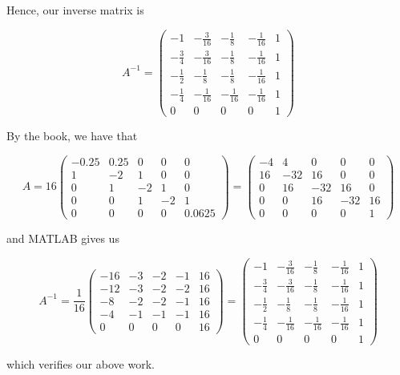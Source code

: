 \begin{solution}
     Hence, our inverse matrix is
     
     $$A^{-1}=\left(\begin{array}{ccccc} -1 & -\frac{3}{16} & -\frac18 & -\frac{1}{16}& 1 
                                      \\ -\frac{3}{4} & -\frac{3}{16} & -\frac18 & -\frac{1}{16} & 1
                                      \\ -\frac12 & -\frac18 & -\frac18 & -\frac{1}{16} & 1
                                      \\ -\frac14 & -\frac{1}{16} & -\frac{1}{16} & -\frac{1}{16} & 1
                                      \\ 0 & 0 & 0 & 0 & 1 \end{array}\right)$$
                                      
    By the book, we have that
    
    $$A=16\left(\begin{array}{ccccc} -0.25 & 0.25 & 0 & 0 & 0\\ 1 & -2 & 1 & 0 & 0\\ 0 & 1 & -2 & 1 & 0
                                  \\ 0 & 0 & 1 & -2 & 1\\ 0 & 0 & 0 & 0 & 0.0625 \end{array}\right)
       =\left(\begin{array}{ccccc} -4 & 4 & 0 & 0 & 0\\ 16 & -32 & 16 & 0 & 0\\ 0 & 16 & -32 & 16 & 0
                                \\ 0 & 0 & 16 & -32 & 16\\ 0 & 0 & 0 & 0 & 1 \end{array}\right)$$
                                
    and MATLAB gives us
    
    $$A^{-1}=\frac{1}{16}\left(\begin{array}{ccccc} -16 & -3 & -2 & -1 & 16\\ -12 & -3 & -2 & -2 & 16
        \\ -8 & -2 & -2 & -1 & 16\\ -4 & -1 & -1 & -1 & 16\\ 0 & 0 & 0 & 0 & 16 \end{array}\right)
    =\left(\begin{array}{ccccc} -1 & -\frac{3}{16} & -\frac18 & -\frac{1}{16} & 1
        \\ -\frac{3}{4} & -\frac{3}{16} & -\frac18 & -\frac{1}{16} & 1
        \\ -\frac12 & -\frac18 & -\frac18 & -\frac{1}{16} & 1
        \\ -\frac14 & -\frac{1}{16} & -\frac{1}{16} & -\frac{1}{16} & 1\\ 0 & 0 & 0 & 0 & 1 
     \end{array}\right)$$
     
    which verifies our above work.

\end{solution}